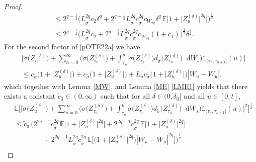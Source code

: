 \documentclass[11pt,a4paper]{article}
\numberwithin{equation}{section}
\theoremstyle{definition}
\newcommand{\E}{{\mathbb{E}}}
\newcommand{\diff}{\mathop{}\!\mathrm{d}}
\begin{document}
\begin{proof}
\begin{equation}
\begin{aligned}
    &\leq 2^{q-\frac{1}{2}}\Big( L_{\widetilde\sigma}^{2q} c_2\delta^{q} 
    + 2^{q-\frac{1}{2}} L_{\widetilde\sigma}^{2q} c_{\widetilde\sigma}^{2q}  c_{W_{2q}} \delta^q\, \E\Big[1+ \big| Z^{(\delta)}_{\underline u}\big|^{2q} \Big]\Big)^\frac{1}{2}\\
    &\leq 2^{q-\frac{1}{2}} \Big( L_{\widetilde\sigma}^{2q} c_2
    +2^{q-\frac{1}{2}} L_{\widetilde\sigma}^{2q} c_{\widetilde\sigma}^{2q} c_{W_{2q}} (1+c_1) \Big)^\frac{1}{2}\delta^{\frac{q}{2}}.
    \end{aligned}
\end{equation}
For the second factor of \eqref{pOTE22a} we have
\begin{equation}
    \begin{aligned}
    &\Big| \widetilde\sigma\big(Z^{(\delta)}_{u} \big)+ \sum_{n=0}^{\infty} \Big( \widetilde\sigma \big(Z^{(\delta)}_{\tau_n}\big) + \int_{\tau_n}^u \widetilde\sigma \big(Z^{(\delta)}_{\tau_n}\big)d_{\widetilde\sigma} \big(Z^{(\delta)}_{\tau_n}\big)\diff W_s \Big)\mathds{1}_{(\tau_n,\tau_{n+1}]}(u) \Big|\\
    &\leq  c_{\widetilde\sigma}\big(1+ \big| Z^{(\delta)}_{u}\big|\big) + c_{\widetilde\sigma} \big(1+ \big| Z^{(\delta)}_{\underline u}\big|\big)
    + L_{\widetilde\sigma} c_{\widetilde\sigma} \big(1+ \big| Z^{(\delta)}_{\underline u}\big|\big) |W_u-W_{\underline u}|,
    \end{aligned}
\end{equation}
which together with Lemma \ref{MW}, and Lemma \ref{ME} \eqref{LME1} yields that there exists a constant $\widetilde c_3\in(0,\infty)$ such that for all $\delta \in(0,\delta_0]$ and all $u\in[0,t]$,
\begin{equation}\label{pOTE24a}
    \begin{aligned}
    &\E\Big[\Big| \widetilde\sigma\big(Z^{(\delta)}_{u} \big)+ \sum_{n=0}^{\infty} \Big( \widetilde\sigma \big(Z^{(\delta)}_{\tau_n}\big) + \int_{\tau_n}^u \widetilde\sigma \big(Z^{(\delta)}_{\tau_n}\big)d_{\widetilde\sigma} \big(Z^{(\delta)}_{\tau_n}\big)\diff W_s \Big)\mathds{1}_{(\tau_n,\tau_{n+1}]}(u)\Big|^2\Big]^{\frac{1}{2}}\\
    &\leq \widetilde c_3\, \Big( 2^{2q-1} c_{\widetilde\sigma}^{2q}\, \E\Big[ 1+ \big| Z^{(\delta)}_{u}\big|^{2q}\Big]
    +2^{2q-1} c_{\widetilde\sigma}^{2q}\, \E\Big[1+ \big| Z^{(\delta)}_{\underline u}\big|^{2q}\Big]\\
    &\quad\quad\quad\quad +2^{2q-1} L_{\widetilde\sigma}^{2q} c_{\widetilde\sigma}^{2q} \, \E\Big[\big(1+ \big| Z^{(\delta)}_{\underline u}\big|^{2q}\big) |W_u-W_{\underline u}|^{2q}\Big]\Big)^{\frac{1}{2}}\\

\end{aligned}
\end{equation}
\end{proof}
\end{document}
